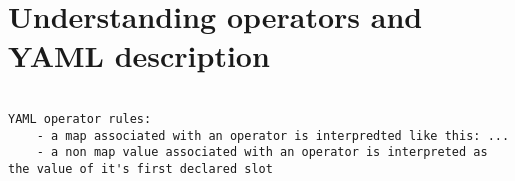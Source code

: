 \section{Understanding operators and YAML description}
\label{sec:operators}

\begin{verbatim}

YAML operator rules:
	- a map associated with an operator is interpredted like this: ...
	- a non map value associated with an operator is interpreted as the value of it's first declared slot

\end{verbatim}


